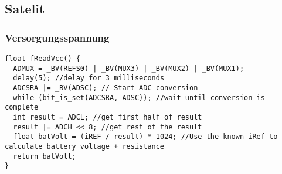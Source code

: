 \subsection{Satelit}

\subsubsection{Versorgungsspannung}
\begin{verbatim}
float fReadVcc() {
  ADMUX = _BV(REFS0) | _BV(MUX3) | _BV(MUX2) | _BV(MUX1);
  delay(5); //delay for 3 milliseconds
  ADCSRA |= _BV(ADSC); // Start ADC conversion
  while (bit_is_set(ADCSRA, ADSC)); //wait until conversion is complete
  int result = ADCL; //get first half of result
  result |= ADCH << 8; //get rest of the result
  float batVolt = (iREF / result) * 1024; //Use the known iRef to calculate battery voltage + resistance
  return batVolt;
}
\end{verbatim}